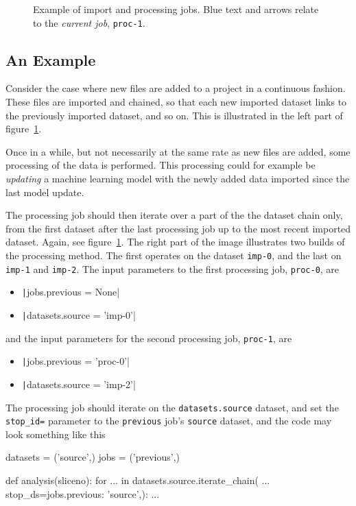 \begin{figure}[t!]
  \begin{center}
    \hspace{2.5cm}
    \caption{Example of import and processing jobs.  Blue text and
    arrows relate to the \textsl{current job}, \texttt{proc-1}.}
    \label{fig:dsprocchain}
  \end{center}
\end{figure}



\subsection{An Example}
Consider the case where new files are added to a project in a
continuous fashion.  These files are imported and chained, so that
each new imported dataset links to the previously imported dataset,
and so on.  This is illustrated in the left part of
figure~\ref{fig:dsprocchain}.

Once in a while, but not necessarily at the same rate as new files are
added, some processing of the data is performed.  This processing
could for example be \textsl{updating} a machine learning model with
the newly added data imported since the last model update.

The processing job should then iterate over a part of the the dataset
chain only, from the first dataset after the last processing job up to
the most recent imported dataset.  Again, see
figure~\ref{fig:dsprocchain}.  The right part of the image illustrates
two builds of the processing method.  The first operates on the
dataset \texttt{imp-0}, and the last on \texttt{imp-1}
and \texttt{imp-2}.  The input parameters to the first processing
job, \texttt{proc-0}, are
\begin{itemize}
\item[] \texttt|jobs.previous = None|
\item[] \texttt|datasets.source = 'imp-0'|
\end{itemize}
and the input parameters for the second processing
job, \texttt{proc-1}, are
\begin{itemize}
\item[] \texttt|jobs.previous = 'proc-0'|
\item[] \texttt|datasets.source = 'imp-2'|
\end{itemize}

The processing job should iterate on the \texttt{datasets.source}
dataset, and set the \texttt{stop\_id=} parameter to
the \texttt{previous} job's \texttt{source} dataset, and the code may
look something like this
\begin{python}
datasets = ('source',)
jobs = ('previous',)

def analysis(sliceno):
    for ... in datasets.source.iterate_chain(
            ...
            stop_ds={jobs.previous: 'source',}):
    ...
\end{python}












